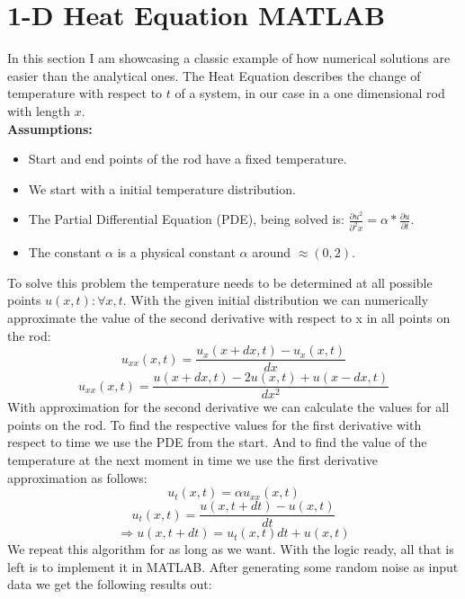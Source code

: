 \documentclass{article}
\begin{document}
\section{1-D Heat Equation MATLAB}
In this section I am showcasing a classic example of how numerical solutions are easier than the analytical ones. The Heat Equation describes the change of temperature with respect to $t$ of a system, in our case in a one dimensional rod with length $x$. \\
\textbf{Assumptions:}
\begin{itemize}
    \item Start and end points of the rod have a fixed temperature.
    \item We start with a initial temperature distribution.
    \item  The Partial Differential Equation (PDE), being solved is: $\frac{\partial u^2}{\partial^2x} = \alpha*\frac{\partial u}{\partial t}$.
    \item  The constant $\alpha$ is a physical constant $\alpha$ around $\approx (0, 2)$. 
\end{itemize}
To solve this problem the temperature needs to be determined at all possible points $u(x, t): \forall x, t$. With the given initial distribution we can numerically approximate the value of the second derivative with respect to x in all points on the rod:
\begin{equation*}
    u_{xx}(x, t) = \frac{u_x(x+dx, t) - u_x(x, t)}{dx} 
\end{equation*}
\begin{equation*}
    u_{xx}(x, t) = \frac{u(x+dx, t) - 2u(x, t) + u(x-dx, t)}{dx^2}
\end{equation*}
With approximation for the second derivative we can calculate the values for all points on the rod. To find the respective values for the first derivative with respect to time we use the PDE from the start. And to find the value of the temperature at the next moment in time we use the first derivative approximation as follows:
\begin{equation*}
    u_t(x, t) = \alpha u_{xx}(x, t)
\end{equation*}
\begin{equation*}
    u_t(x, t) = \frac{u(x, t+dt) - u(x, t)}{dt}
\end{equation*}
\begin{equation*} 
    \Rightarrow u(x, t+dt) = u_t(x, t)dt + u(x, t)
\end{equation*}
We repeat this algorithm for as long as we want. With the logic ready, all that is left is to implement it in MATLAB. After generating some random noise as input data we get the following results out:
\end{document}

